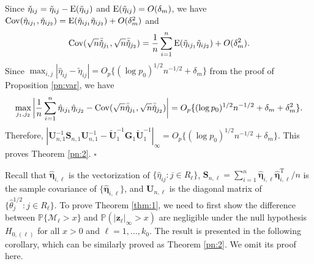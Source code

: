 \documentclass[12pt]{article}
\def\T{{ \mathrm{\scriptscriptstyle T} }}
\theoremstyle{definition}
\newcommand{\E}{\rm E}
\newcommand{\Cor}{\rm Corr}
\newcommand{\Cov}{\rm Cov}
\newcommand{\bG}{{\mathbf G}}
\newcommand{\bS}{{\mathbf S}}
\newcommand{\bU}{{\mathbf U}}
\newcommand{\bW}{{\mathbf W}}
\newcommand{\bz}{{\mathbf z}}
\newcommand{\bfeta}  {\boldsymbol{\eta}}
\begin{document}
Since $\check{\eta}_{ij} = \tilde{\eta}_{ij} - {\E}(\tilde{\eta}_{ij})$ and ${\E}(\tilde{\eta}_{ij}) = O(\delta_m)$, we have ${\Cov}(\check{\eta}_{ij_1}, \check{\eta}_{ij_2}) = {\E}(\tilde{\eta}_{ij_1}\tilde{\eta}_{ij_2}) + O(\delta_m^2)$ and 
$${\Cov}(\sqrt{n}\bar{\check\eta}_{j_1}, \sqrt{n}\bar{\check\eta}_{j_2}) = \frac{1}{n} \sum_{i = 1}^{n} {\E}(\tilde{\eta}_{ij_1}\tilde{\eta}_{ij_2}) + O(\delta_m^2).$$
Since $\max_{i,j} |\hat{\eta}_{ij} - \tilde{\eta}_{ij}| = O_{p}\{(\log p_0)^{1/2} n^{-1/2} + \delta_m\}$ from the proof of Proposition \ref{pn:var}, we have
$$\max_{j_1, j_2} \bigg|\frac{1}{n}\sum_{i = 1}^{n} \hat{\eta}_{i j_1}\hat{\eta}_{i j_2} - {\Cov}(\sqrt{n}\bar{\check\eta}_{j_1}, \sqrt{n}\bar{\check\eta}_{j_2})\bigg| = O_{p}\{(\log p_0)^{1/2} n^{-1/2} + \delta_m + \delta_m^2\}.$$
Therefore, $|\bU_{n, 1}^{-1} \bS_{n, 1} \bU_{n, 1}^{-1} - \tilde{\bU}_{1}^{-1}\bG_{1}\tilde{\bU}_{1}^{-1}|_{\infty} = O_{p}\{(\log p_0)^{1/2} n^{-1/2} + \delta_m\}$.
This proves Theorem \ref{pn:2}. $\square$

\medskip
Recall that $\hat{\bfeta}_{i, \ell}$ is the vectorization of $\{\hat{\eta}_{ij} : j \in R_{\ell}\}$, $\bS_{n, \ell} = \sum_{i = 1}^{n} \hat{\bfeta}_{i, \ell} \hat{\bfeta}_{i, \ell}^{\T} / n$ is the sample covariance of $\{\hat{\bfeta}_{i, \ell}\}$, and $\bU_{n, \ell}$ is the diagonal matrix of $\{\hat{\theta}_{j}^{1/2}: j \in R_\ell\}$.
To prove Theorem \ref{thm:1}, we need to first show the difference between $\mathbb{P}\{\mathcal{M}_{\ell} > x\}$ and $\mathbb{P}(|\bz_{\ell}|_{\infty} > x)$ are negligible under the null hypothesis $H_{0, (\ell)}$ for all $x > 0$ and $\ell = 1, \ldots, k_0$. The result is presented in the following corollary, which can be similarly proved as Theorem \ref{pn:2}. We omit its proof here.

\end{document}
